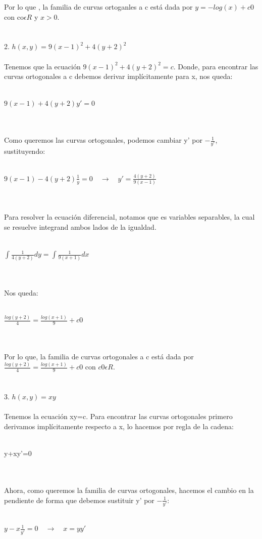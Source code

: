 \documentclass[a4paper,10pt]{article}
\begin{document}
Por lo que , la familia de curvas ortoganles a c está dada por $y=-log(x) + c0$ con co$\epsilon R$ y $x>0$.\\\\\\
2. $h(x,y)=9(x-1)^2 +4(y+2)^2 $\\\\
Tenemos que la ecuación $9(x-1)^2 +4(y+2)^2 = c$. Donde, para encontrar las curvas ortogonales a c debemos derivar implícitamente para x, nos queda:\\\\
\centerline{$9(x-1) + 4(y+2)y'=0$}\\\\
Como queremos las curvas ortogonales, podemos cambiar y' por $-\frac{1}{y'}$, sustituyendo:\\\\
\centerline{$9(x-1) - 4(y+2)\frac{1}{y}=0\quad \rightarrow \quad y'=\frac{4(y+2)}{9(x-1)}$}\\\\
Para resolver la ecuación diferencial, notamos que es variables separables, la cual se resuelve integrand ambos lados de la igualdad.\\\\
\centerline{$\int \frac{1}{4(y+2)}dy = \int \frac{1}{9(x+1)} dx $}\\\\
Nos queda:\\\\
\centerline{$\frac{log(y+2)}{4} = \frac{log(x+1)}{9} +c0$}\\\\
Por lo que, la familia de curvas ortogonales a c está dada por $\frac{log(y+2)}{4} = \frac{log(x+1)}{9} +c0$ con $c0 \epsilon R$.\\\\\\
3. $h(x,y)=xy$\\\\
Tenemos la ecuación xy=c. Para encontrar las curvas ortogonales primero derivamos implícitamente respecto a x, lo hacemos por regla de la cadena:\\\\
\centerline{y+xy'=0}\\\\
Ahora, como queremos la familia de curvas ortogonales, hacemos el cambio en la pendiente de forma que debemos sustituir y' por $-\frac{1}{y'}$:\\\\
\centerline{$y-x\frac{1}{y'}= 0 \quad\rightarrow\quad x=yy'$}\\\\
\end{document}

